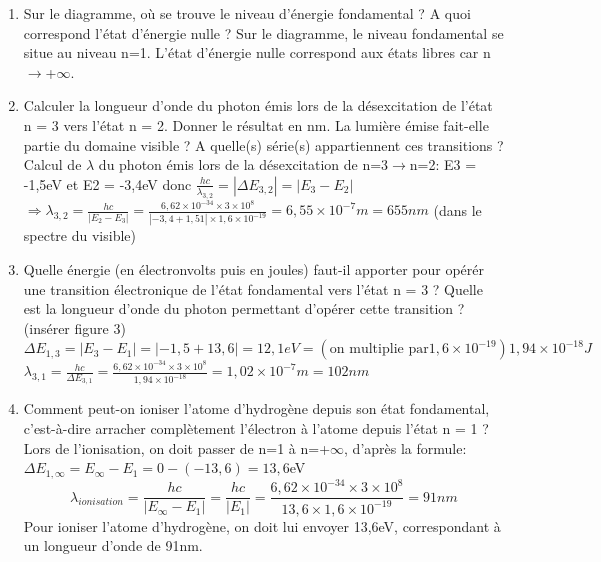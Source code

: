 \documentclass{article}
\begin{document}
\begin{enumerate}
    \item Sur le diagramme, où se trouve le niveau d'énergie fondamental ? A quoi correspond l'état d'énergie nulle ?\newline
    Sur le diagramme, le niveau fondamental se situe au niveau n=1. L'état d'énergie nulle correspond aux états libres car n$\to$+$\infty$.
    \item Calculer la longueur d'onde du photon émis lors de la désexcitation de l'état n = 3 vers l'état n = 2. Donner le résultat en nm. La lumière émise fait-elle partie du domaine visible ? A quelle(s) série(s) appartiennent ces transitions ?\newline\newline
    Calcul de $\lambda$ du photon émis lors de la désexcitation de n=3$\to$n=2:\newline
    E3 = -1,5eV et E2 = -3,4eV donc $\frac{hc}{\lambda_{3,2}} = |\Delta E_{3,2}| = |E_{3}-E_{2}|$\newline
    $\Longrightarrow\lambda_{3,2} = \frac{hc}{|E_{2}-E_{3}|} = \frac{6,62\times 10^{-34}\times 3\times 10^{8}}{|-3,4+1,51|\times 1,6\times 10^{-19}} = 6,55\times 10^{-7}m = 655nm$ (dans le spectre du visible)
    \item Quelle énergie (en électronvolts puis en joules) faut-il apporter pour opérér une transition électronique de l'état fondamental vers l'état n = 3 ? Quelle est la longueur d'onde du photon permettant d'opérer cette transition ? (insérer figure 3)\newline
    $\Delta E_{1,3}=|E_{3}-E_{1}|=|-1,5+13,6|= 12,1 eV = (\text{on multiplie par} 1,6\times 10^{-19}) 1,94\times 10^{-18}J$\newline
    $\lambda_{3,1} = \frac{hc}{\Delta E_{3,1}} = \frac{6,62\times 10^{-34}\times 3\times 10^{8}}{1,94\times 10^{-18}} = 1,02\times 10^{-7}m = 102nm$ 
    \item Comment peut-on ioniser l'atome d'hydrogène depuis son état fondamental, c'est-à-dire arracher complètement l'électron à l'atome depuis l'état n = 1 ?
    Lors de l'ionisation, on doit passer de n=1 à n=+$\infty$, d'après la formule: $\Delta E_{1,\infty} = E_{\infty}-E_{1}=0-(-13,6)= 13,6$eV
    \[ \lambda_{ionisation}=\frac{hc}{|E_{\infty}-E_{1}|} = \frac{hc}{|E_{1}|} = \frac{6,62\times 10^{-34}\times 3\times 10^{8}}{13,6\times 1,6\times 10^{-19}} = 91nm \]
    Pour ioniser l'atome d'hydrogène, on doit lui envoyer 13,6eV, correspondant à un longueur d'onde de 91nm.
    \newpage
    \begin{figure}[h]

\end{figure}
\end{enumerate}
\end{document}
